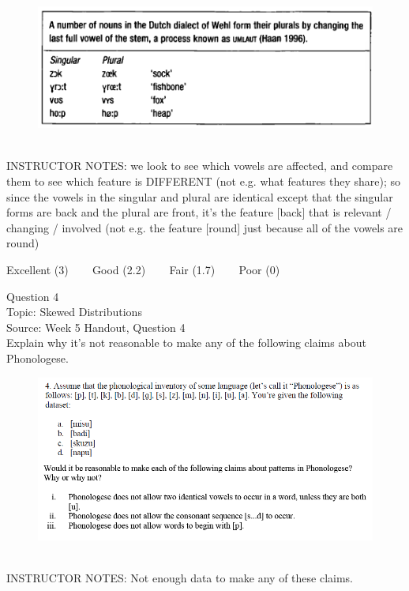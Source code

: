 \documentclass[12pt]{article}
\begin{document}
\begin{figure}[H]
\includegraphics{../images/dutch.png}
\end{figure}

~\\
INSTRUCTOR NOTES: we look to see which vowels are affected, and compare them to see which feature is DIFFERENT (not e.g. what features they share); so since the vowels in the singular and plural are identical except that the singular forms are back and the plural are front, it's the feature [back] that is relevant / changing / involved (not e.g. the feature [round] just because all of the vowels are round)


\vfill
Excellent (3) ~~~ Good (2.2) ~~~ Fair (1.7) ~~~ Poor (0)
\newpage

{\large Question 4}\\

Topic: Skewed Distributions\\
Source: Week 5 Handout, Question 4\\

Explain why it's not reasonable to make any of the following claims about Phonologese.\\

\begin{figure}[H]
\includegraphics{../images/Phonologese.png}
\end{figure}

~\\
INSTRUCTOR NOTES: Not enough data to make any of these claims.
\end{document}
